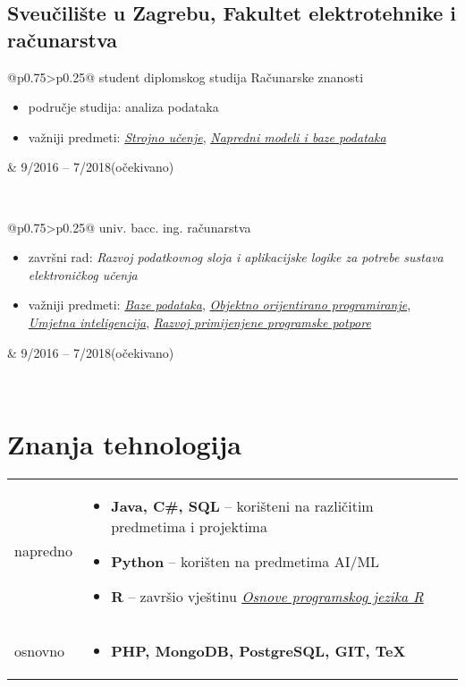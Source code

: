 \documentclass[a4paper]{article}
\makeatletter
\newlength{\tablewidth}
\newenvironment{period}[2]{%
\newcommand{\sarma}{#2}%
\setlength{\tablewidth}{\linewidth}
\addtolength{\tablewidth}{-2\tabcolsep}
\begin{tabular}{@{}p{0.75\tablewidth}>{\raggedleft\arraybackslash}p{0.25\tablewidth}@{}}%
#1 \newline
\begin{itemize}
}{%
\end{itemize} & \sarma \\%
\end{tabular}\\
}
\newenvironment{skills}{%
\setlength{\tablewidth}{\linewidth}
\addtolength{\tablewidth}{-2\tabcolsep}
\begin{tabular}{@{}p{0.15\tablewidth}p{0.85\tablewidth}@{}}
}{%
\end{tabular}
}
\makeatother
\begin{document}
\subsection{Sveučilište u Zagrebu, Fakultet elektrotehnike i računarstva}
\begin{period}{student diplomskog studija Računarske znanosti} {9/2016 -- 7/2018\linebreak(očekivano)}
    \item područje studija:
        analiza podataka
    \item važniji predmeti:
	    \textit{\href{%
	    	}{Strojno učenje}},
	    \textit{\href{%
	    	}{Napredni modeli i baze podataka}}
\end{period}
\begin{period}{univ. bacc. ing. računarstva}{9/2013 -- 7/2016}
    \item završni rad:
        \textit{Razvoj podatkovnog sloja i aplikacijske logike za potrebe sustava elektroničkog učenja}
    \item važniji predmeti:
	    \textit{\href{%
	    		}{Baze podataka}},
		\textit{\href{%
				}{Objektno orijentirano programiranje}},
		\textit{\href{%
				}{Umjetna inteligencija}},
		\textit{\href{%
				}{Razvoj primijenjene programske potpore}}
\end{period}

\section{Znanja tehnologija}
\begin{skills}
    napredno &
    \begin{itemize}
        \item \textbf{Java, C\#, SQL} -- korišteni na različitim predmetima i projektima
        \item \textbf{Python} -- korišten na predmetima AI/ML
        \item \textbf{R} -- završio vještinu \textit{\href{%
        	}{Osnove programskog jezika R}}
    \end{itemize} \\
    osnovno &
    \begin{itemize}
        \item \textbf{PHP, MongoDB, PostgreSQL, GIT, TeX}
    \end{itemize} \\
\end{skills}
\end{document}
